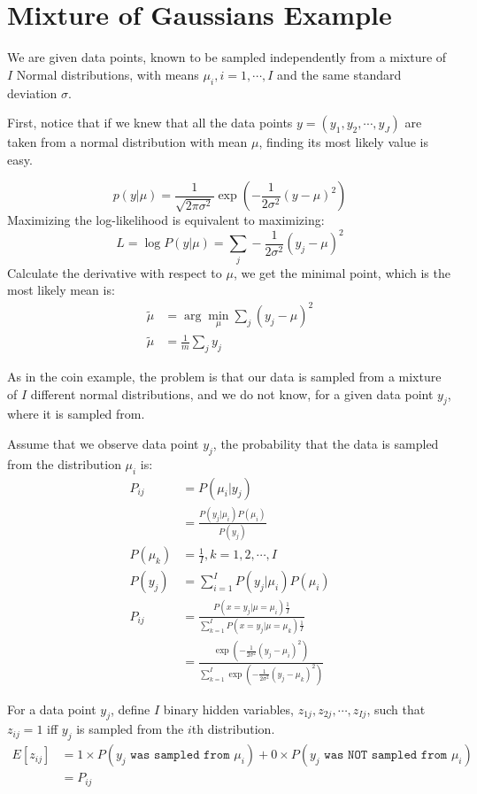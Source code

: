\documentclass{article}  %
\begin{document}
\section{Mixture of Gaussians Example}

We are given data points, known to be sampled independently from a mixture of
$I$ Normal distributions, with means $\mu_i, i = 1, \cdots, I$ and the same
standard deviation $\sigma$.

First, notice that if we knew that all the data points
$y=(y_1,y_2,\cdots,y_J)$ are taken from a normal distribution with mean $\mu$,
finding its most likely value is easy.

\[
p(y|\mu) = \frac{1}{\sqrt{2\pi\sigma^2} }\exp \left
(-\frac{1}{2\sigma^2}(y-\mu)^2\right)
\]
Maximizing the log-likelihood is equivalent to maximizing:
\[
L=\log P(y|\mu)=\sum_j - \frac{1}{2\sigma^2}(y_j-\mu)^2
\]
Calculate the derivative with respect to $\mu$, we get the minimal point, which is the most likely mean is:
\begin{align*}
\tilde \mu &= \arg \min_{\mu} \sum_j (y_j-\mu)^2\\
\tilde \mu &= \frac{1}{m} \sum_j y_j
\end{align*}


As in the coin example, the problem is that our data is sampled from a mixture
of $I$ different normal distributions, and we do not know, for a given data
point $y_j$, where it is sampled from.

Assume that we observe data point $y_j$, the probability that the data is
sampled from the distribution $\mu_i$ is:
\begin{align*}
P_{ij} &= P(\mu_i|y_j)\\
&= \frac{P(y_j|\mu_i)P(\mu_i)}{P(y_j)}\\
P(\mu_k) &= \frac{1}{I}, k = 1, 2, \cdots, I\\
P(y_j) &=  \sum_{i=1}^I P(y_j|\mu_i)P(\mu_i)  \\
P_{ij} &= \frac{P(x=y_j|\mu=\mu_i)\frac{1}{I}}{\sum_{k=1}^I P(x=y_j|\mu=\mu_k)
\frac{1}{I}}\\
&= \frac{\exp \left(-\frac{1}{2\sigma^2} (y_j-\mu_i)^2\right)}{\sum_{k=1}^I \exp
\left( -\frac{1}{2\sigma^2} (y_j-\mu_k)^2\right)}
\end{align*}

For a data point $y_j$, define $I$ binary hidden variables, $z_{1j}, z_{2j},
\cdots, z_{Ij}$, such that $z_{ij}=1$ iff $y_j$ is sampled from the $i$th
distribution.
\begin{align*}
E[z_{ij}] &= 1 \times P(y_j \texttt{ was sampled from $\mu_i$}) + 0 \times P(y_j \texttt{ was NOT sampled from $\mu_i$})\\
 &=P_{ij}
\end{align*}
\end{document}
